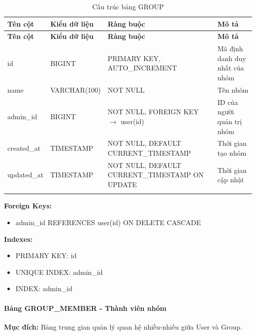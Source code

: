 \small
\begin{longtable}{|>{\raggedright\arraybackslash}p{3.5cm}|>{\raggedright\arraybackslash}p{3cm}|>{\raggedright\arraybackslash}p{4cm}|>{\raggedright\arraybackslash}p{4cm}|}
\hline
\textbf{Tên cột} & \textbf{Kiểu dữ liệu} & \textbf{Ràng buộc} & \textbf{Mô tả} \\
\hline
\endfirsthead
\hline
\textbf{Tên cột} & \textbf{Kiểu dữ liệu} & \textbf{Ràng buộc} & \textbf{Mô tả} \\
\hline
\endhead
id & BIGINT & PRIMARY KEY, AUTO\_INCREMENT & Mã định danh duy nhất của nhóm \\
\hline
name & VARCHAR(100) & NOT NULL & Tên nhóm \\
\hline
admin\_id & BIGINT & NOT NULL, FOREIGN KEY $\rightarrow$ user(id) & ID của người quản trị nhóm \\
\hline
created\_at & TIMESTAMP & NOT NULL, DEFAULT CURRENT\_TIMESTAMP & Thời gian tạo nhóm \\
\hline
updated\_at & TIMESTAMP & NOT NULL, DEFAULT CURRENT\_TIMESTAMP ON UPDATE & Thời gian cập nhật \\
\hline
\caption{Cấu trúc bảng GROUP}
\end{longtable}

\textbf{Foreign Keys:}
\begin{itemize}
    \item admin\_id REFERENCES user(id) ON DELETE CASCADE
\end{itemize}

\textbf{Indexes:}
\begin{itemize}
    \item PRIMARY KEY: id
    \item UNIQUE INDEX: admin\_id
    \item INDEX: admin\_id
\end{itemize}

\paragraph{Bảng GROUP\_MEMBER - Thành viên nhóm}
\textbf{Mục đích:} Bảng trung gian quản lý quan hệ nhiều-nhiều giữa User và Group.


